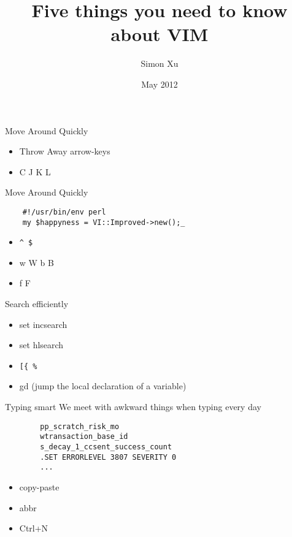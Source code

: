 \documentclass[c]{beamer}
\title{Five things you need to know about VIM}
\author{Simon Xu}
\institute{PayPal}
\date{May 2012}
\begin{document}
\begin{frame}[plain]
    \titlepage
\end{frame}

\begin{frame}{Move Around Quickly}
    \begin{itemize}
        \item Throw Away arrow-keys
        \pause
        \item C {\color{blue}J} K {\color{blue}L}
    \end{itemize}
\end{frame}

\begin{frame}[fragile]{Move Around Quickly}
    \begin{verbatim}
    #!/usr/bin/env perl
    my $happyness = VI::Improved->new();_
    \end{verbatim}
    \pause
    
    \begin{itemize}
        \item \verb|^ $|
        \pause
        \item w W b B
        \pause
        \item f F      
    \end{itemize}
\end{frame}

\begin{frame}[fragile]{Search efficiently}
    \begin{itemize}
        \item set incsearch
        \pause
        \item set hlsearch
        \pause
        \item \verb=[{ %= 
        \pause
        \item gd (jump the local declaration of a variable)
    \end{itemize}
\end{frame}

\begin{frame}[fragile]{Typing smart}
    We meet with awkward things when typing every day
    \pause
    \begin{verbatim}
        pp_scratch_risk_mo
        wtransaction_base_id
        s_decay_1_ccsent_success_count
        .SET ERRORLEVEL 3807 SEVERITY 0
        ...
    \end{verbatim}
    \pause
    
    \begin{itemize}
        \item copy-paste
        \pause
        \item abbr
        \pause
        \item Ctrl+N
    \end{itemize}
\end{frame}
\end{document}
